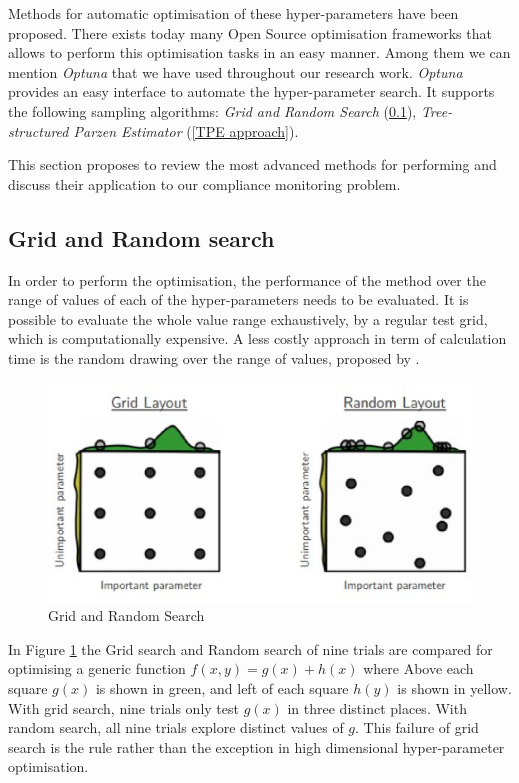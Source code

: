 Methods for automatic optimisation of these hyper-parameters have been proposed. There exists today many Open Source optimisation frameworks that allows to perform this optimisation tasks in an easy manner. Among them we can mention \textit{Optuna} \citep{optuna_2019} that we have used throughout our research work. \textit{Optuna} provides an easy interface to automate the hyper-parameter search. It supports the following sampling algorithms: \textit{Grid and Random Search} (\ref{Grid and Random search}), \textit{Tree-structured Parzen Estimator} (\ref{TPE approach}).

This section proposes to review the most advanced methods for performing and discuss their application to our compliance monitoring problem.

\subsection{Grid and Random search} \label{Grid and Random search}

In order to perform the optimisation, the performance of the method over the range of values of each of the hyper-parameters needs to be evaluated. It is possible to evaluate the whole value range exhaustively, by a regular test grid, which is computationally expensive. A less costly approach in term of calculation time is the random drawing over the range of values, proposed by \citep{bergstra2012random}. 
\begin{figure}
\centerline{\includegraphics[scale=0.7]{images/chapter_2/random_search.eps}}
\caption{Grid and Random Search \citep{bergstra2012random}}
\label{fig:Grid and Random Search}
\end{figure}
In Figure \ref{fig:Grid and Random Search} the Grid search and Random search of nine trials are compared for optimising a generic function $f(x, y) = g(x) + h(x)$ where Above each square $g(x)$ is shown in green, and left of each square $h(y)$ is shown in yellow. With grid search, nine trials only test $g(x)$ in three distinct places. With random search, all nine trials explore distinct values of $g$. This failure of grid search is the rule rather than the exception in high dimensional hyper-parameter optimisation.


